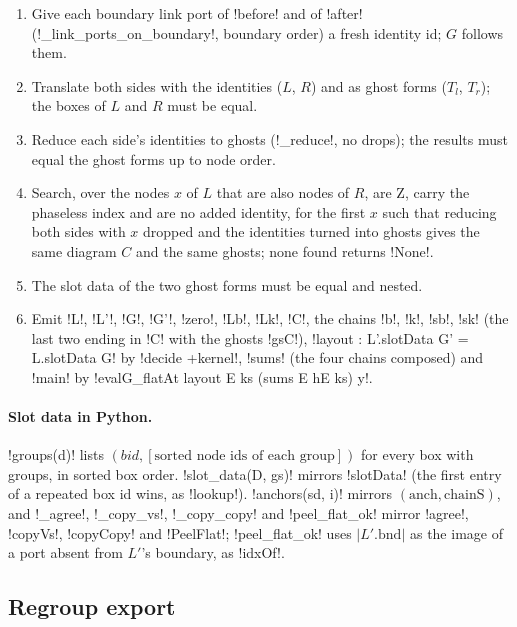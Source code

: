\begin{algorithm}
\begin{enumerate}
\item Give each boundary link port of \py!before! and of \py!after! (\py!_link_ports_on_boundary!, boundary order) a fresh identity id; $G$ follows them.
\item Translate both sides with the identities ($L$, $R$) and as ghost forms ($T_l$, $T_r$); the boxes of $L$ and $R$ must be equal.
\item Reduce each side's identities to ghosts (\py!_reduce!, no drops); the results must equal the ghost forms up to node order.
\item Search, over the nodes $x$ of $L$ that are also nodes of $R$, are Z, carry the phaseless index and are no added identity, for the first $x$ such that reducing both sides with $x$ dropped and the identities turned into ghosts gives the same diagram $C$ and the same ghosts; none found returns \py!None!.
\item The slot data of the two ghost forms must be equal and nested.
\item Emit \lean!L!, \lean!L'!, \lean!G!, \lean!G'!, \lean!zero!, \lean!Lb!, \lean!Lk!, \lean!C!, the chains \lean!b!, \lean!k!, \lean!sb!, \lean!sk! (the last two ending in \lean!C! with the ghosts \lean!gsC!), \lean!layout : L'.slotData G' = L.slotData G! by \lean!decide +kernel!, \lean!sums! (the four chains composed) and \lean!main! by \lean!evalG_flatAt layout E ks (sums E hE ks) y!.
\end{enumerate}
\end{algorithm}

\paragraph{Slot data in Python.} \py!groups(d)! lists $(\mathit{bid},[\text{sorted node ids of each group}])$ for every box with groups, in sorted box order. \py!slot_data(D, gs)! mirrors \lean!slotData! (the first entry of a repeated box id wins, as \lean!lookup!). \py!anchors(sd, i)! mirrors $(\mathrm{anch},\mathrm{chainS})$, and \py!_agree!, \py!_copy_vs!, \py!_copy_copy! and \py!peel_flat_ok! mirror \lean!agree!, \lean!copyVs!, \lean!copyCopy! and \lean!PeelFlat!; \py!peel_flat_ok! uses $|L'.\mathrm{bnd}|$ as the image of a port absent from $L'$'s boundary, as \lean!idxOf!.

\subsection{Regroup export}

